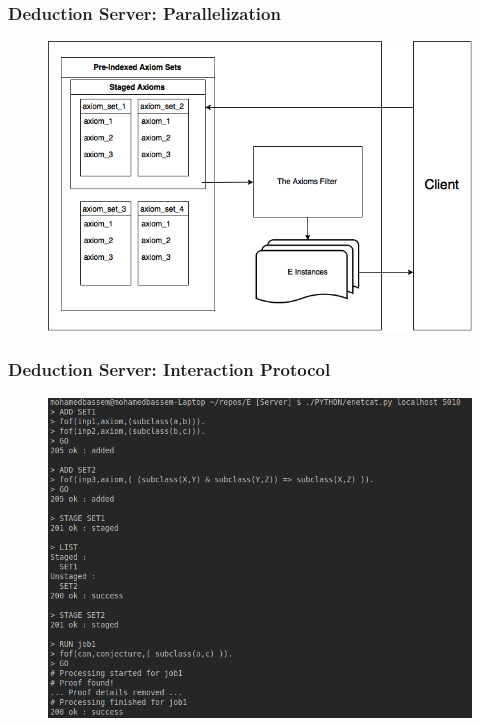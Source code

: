 \documentclass[10pt]{beamer}
\begin{document}
\begin{frame}[fragile]
  \frametitle{Deduction Server: Parallelization}
    \begin{figure} \includegraphics[width=\linewidth,height=\textheight,keepaspectratio]{imgs/TheDeductionServer.png} \end{figure}
\end{frame}

\begin{frame}[fragile]
  \frametitle{Deduction Server: Interaction Protocol}

\begin{figure} \includegraphics[width=\linewidth,height=\textheight,keepaspectratio]{imgs/Demo1.png} \end{figure}
\end{frame}
\end{document}
